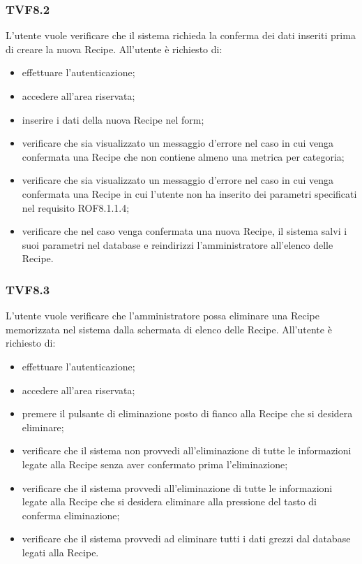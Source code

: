 		\subsubsection{TVF8.2}
			L'utente vuole verificare che il sistema richieda la conferma dei dati inseriti prima di creare la nuova Recipe. All'utente è richiesto di:
			\begin{itemize}
				\item effettuare l'autenticazione;
				\item accedere all'area riservata;
				\item inserire i dati della nuova Recipe nel form;
				\item verificare che sia visualizzato un messaggio d'errore nel caso in cui venga confermata una Recipe che non contiene almeno una metrica per categoria;
				\item verificare che sia visualizzato un messaggio d'errore nel caso in cui venga confermata una Recipe in cui l'utente non ha inserito dei parametri specificati nel requisito ROF8.1.1.4;
				\item verificare che nel caso venga confermata una nuova Recipe, il sistema salvi i suoi parametri nel database e reindirizzi l'amministratore all'elenco delle Recipe.
			\end{itemize}
			
		\subsubsection{TVF8.3}
			L'utente vuole verificare che l'amministratore possa eliminare una Recipe memorizzata nel sistema dalla schermata di elenco delle Recipe. All'utente è richiesto di:
			\begin{itemize}
				\item effettuare l'autenticazione;
				\item accedere all'area riservata;
				\item premere il pulsante di eliminazione posto di fianco alla Recipe che si desidera eliminare;
				\item verificare che il sistema non provvedi all'eliminazione di tutte le informazioni legate alla Recipe senza aver confermato prima l'eliminazione;
				\item verificare che il sistema provvedi all'eliminazione di tutte le informazioni legate alla Recipe che si desidera eliminare alla pressione del tasto di conferma eliminazione;
				\item verificare che il sistema provvedi ad eliminare tutti i dati grezzi dal database legati alla Recipe.
			\end{itemize}
			
